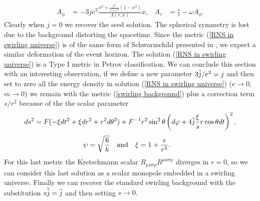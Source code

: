 \begin{align}
A_{\phi} &= -3je^3\frac{x^2+\frac{r^2}{s+e^2}(1-x^2)}{\Lambda(r,x)}x,  & A_{\tau} &= \frac{e}{r}-\omega A_{\phi}.
\end{align}
Clearly when $j=0$ we recover the seed solution. The spherical symmetry is lost due to the background distorting the spacetime. Since the metric (\ref{RNS in swirling universe}) is of the same form of Schwarzschild presented in \citep{Astorino-Martelli}, we expect a similar deformation of the event horizon. The solution (\ref{RNS in swirling universe}) is a Type I metric in Petrov classification. We can conclude this section with an interesting observation, if we define a new parameter $3\Tilde{j}/e^2 = j$ and then set to zero all the energy density in solution (\ref{RNS in swirling universe}) ($e\rightarrow0$, $m\rightarrow0$) we remain with the metric (\ref{swirling background}) plus a correction term $s/r^2$ because of the the scalar parameter
\begin{equation}
    ds^2 = F (-\xi dt^2+ \xi dr^2+r^2d\theta^2) + F^{-1}r^2\sin^2\theta\left(d\varphi+4\Tilde{j}\frac{\xi}{s}r\cos\theta dt\right)^2,
    \label{swirling background conforme}
\end{equation}
\begin{align}
  \psi & = \sqrt{\frac{6}{k}} &\text{and}&& \xi &= 1+\frac{s}{r^2}. \notag
\end{align}
For this last metric the Kretschmann scalar $R_{\mu\nu\sigma\rho}R^{\mu\nu\sigma\rho}$ diverges in $r=0$, so we can consider this last solution as a scalar monopole embedded in a swirling universe. Finally  we can recover the standard swirling background with the substitution $s \Tilde{\Tilde{j}} = \Tilde{j}$ and then setting $s\rightarrow0$.

